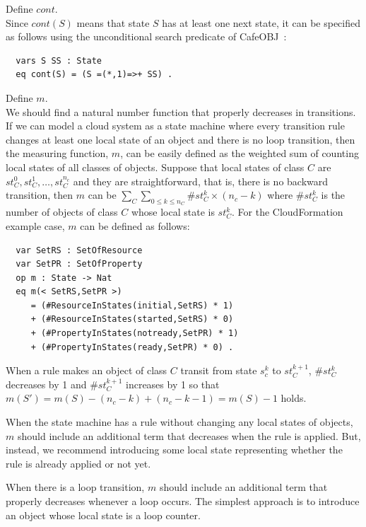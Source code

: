 \documentclass[12pt]{report}
\newcommand{\cafeobj}{{\sf CafeOBJ}~}
\begin{document}
 Define $cont$. \\ Since $cont(S)$ means that
state $S$ has at least one next state, it can be specified as follows
using the unconditional search predicate of \cafeobj:
\small
\begin{verbatim}
  vars S SS : State
  eq cont(S) = (S =(*,1)=>+ SS) .
\end{verbatim}
\normalsize
 Define $m$. \\ We should find a natural
number function that properly decreases in transitions. If we can
model a cloud system as a state machine where every transition rule
changes at least one local state of an object and there is no loop
transition, then the measuring function, $m$, can be easily defined as
the weighted sum of counting local states of all classes of objects.
Suppose that local states of class $C$ are $st_C^0, st_C^1, \dots ,
st_C^{n_c}$ and they are straightforward, that is, there is no
backward transition, then $m$ can be $\sum_{C} \sum_{0 \le k \le n_C}
\#st_C^k \times (n_c - k)$ where $\#st_C^k$ is the number of objects
of class $C$ whose local state is $st_C^k$. For the CloudFormation
example case, $m$ can be defined as follows:
\small
\begin{verbatim}
  var SetRS : SetOfResource
  var SetPR : SetOfProperty
  op m : State -> Nat
  eq m(< SetRS,SetPR >)
     = (#ResourceInStates(initial,SetRS) * 1) 
     + (#ResourceInStates(started,SetRS) * 0)
     + (#PropertyInStates(notready,SetPR) * 1) 
     + (#PropertyInStates(ready,SetPR) * 0) .
\end{verbatim}
\normalsize
When a rule makes an object of class $C$ transit from state $s_c^k$ to
$st_C^{k+1}$, $\#st_C^k$ decreases by 1 and $\#st_C^{k+1}$ increases by 1 so that
$m(S')=m(S)-(n_c-k)+(n_c-k-1)=m(S)-1$ holds.

When the state machine has a rule without changing any local states
of objects, $m$ should include an additional term that decreases when
the rule is applied. But, instead, we recommend introducing some local
state representing whether the rule is already applied or not yet.

When there is a loop transition, $m$ should include an additional term
that properly decreases whenever a loop occurs. The simplest approach
is to introduce an object whose local state is a loop counter.\\
\end{document}
